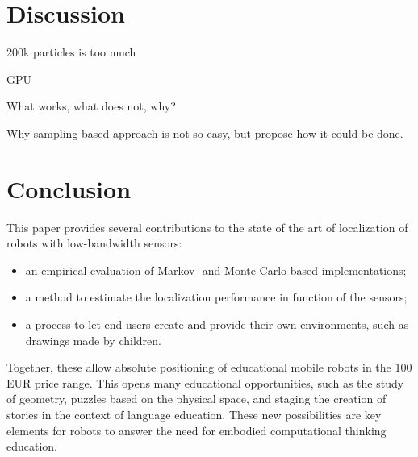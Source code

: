 \documentclass[letterpaper, 10pt, conference]{ieeeconf}
\begin{document}

\section{Discussion}

200k particles is too much

GPU

What works, what does not, why?

Why sampling-based approach is not so easy, but propose how it could be done.

\section{Conclusion}

This paper provides several contributions to the state of the art of localization of robots with low-bandwidth sensors:
\begin{itemize}
\item an empirical evaluation of Markov- and Monte Carlo-based implementations;
\item a method to estimate the localization performance in function of the sensors;
\item a process to let end-users create and provide their own environments, such as drawings made by children.
\end{itemize}
Together, these allow absolute positioning of educational mobile robots in the 100 EUR price range.
This opens many educational opportunities, such as the study of geometry, puzzles based on the physical space, and staging the creation of stories in the context of language education.
These new possibilities are key elements for robots to answer the need for embodied computational thinking education.



\end{document}
